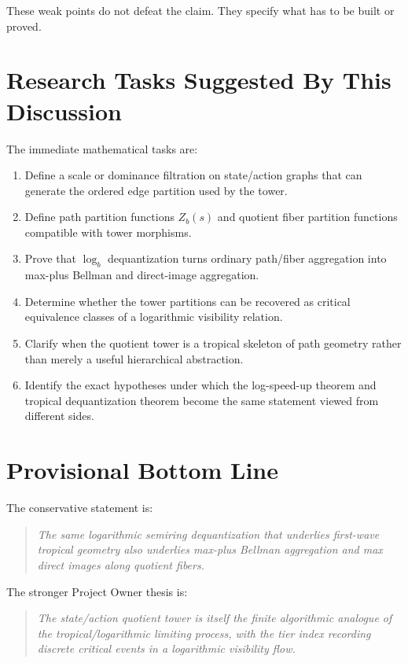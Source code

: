 \documentclass[11pt]{article}
\newenvironment{claimbox}
  {\begin{quote}\itshape}
  {\end{quote}}
\begin{document}
These weak points do not defeat the claim. They specify what has to be built or
proved.

\section{Research Tasks Suggested By This Discussion}

The immediate mathematical tasks are:

\begin{enumerate}[leftmargin=2em]
\item Define a scale or dominance filtration on state/action graphs that can
generate the ordered edge partition used by the tower.
\item Define path partition functions \(Z_b(s)\) and quotient fiber partition
functions compatible with tower morphisms.
\item Prove that \(\log_b\) dequantization turns ordinary path/fiber
aggregation into max-plus Bellman and direct-image aggregation.
\item Determine whether the tower partitions can be recovered as critical
equivalence classes of a logarithmic visibility relation.
\item Clarify when the quotient tower is a tropical skeleton of path geometry
rather than merely a useful hierarchical abstraction.
\item Identify the exact hypotheses under which the log-speed-up theorem and
tropical dequantization theorem become the same statement viewed from different
sides.
\end{enumerate}

\section{Provisional Bottom Line}

The conservative statement is:

\begin{claimbox}
The same logarithmic semiring dequantization that underlies first-wave tropical
geometry also underlies max-plus Bellman aggregation and max direct images along
quotient fibers.
\end{claimbox}

The stronger Project Owner thesis is:

\begin{claimbox}
The state/action quotient tower is itself the finite algorithmic analogue of
the tropical/logarithmic limiting process, with the tier index recording
discrete critical events in a logarithmic visibility flow.
\end{claimbox}
\end{document}
